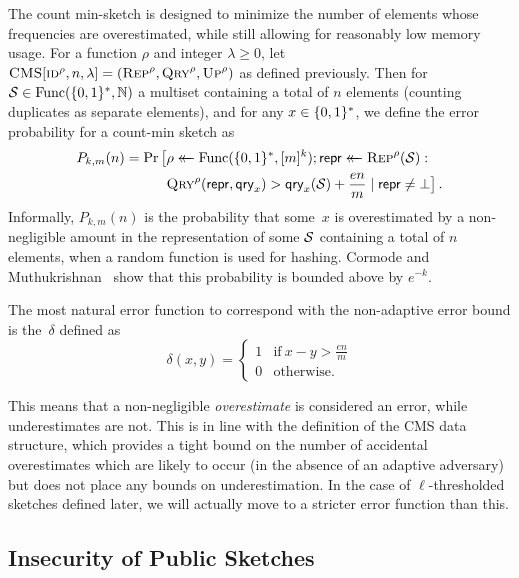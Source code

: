 %
The count min-sketch is designed to minimize the number of elements whose
frequencies are overestimated, while still allowing for reasonably low memory
usage. For a function $\rho$ and integer $\lambda\ge0$, let
$\textnormal{\textsc{CMS}}[\textnormal{\textsc{id}}^\rho,n,\lambda] = (\textnormal{\textsc{Rep}}^\rho,\textnormal{\textsc{Qry}}^\rho,\textnormal{\textsc{Up}}^\rho)$ as defined
previously. Then for $\mathcal{S} \in \mathrm{Func}(\{0,1\}^*,\mathbb{N})$ a multiset containing a total
of $n$ elements (counting duplicates as separate elements), and for any
$x \in \{0,1\}^*$, we define the error probability for a count-min sketch as
\begin{equation}\label{eq:bf-fp}
  \begin{aligned}
    P_{k,m}(n) =
      \Pr\big[&\rho \mathrel{\leftarrow\mkern-14mu\leftarrow} \mathrm{Func}(\{0,1\}^*,[m]^k);
              \mathsf{repr} \mathrel{\leftarrow\mkern-14mu\leftarrow} \textnormal{\textsc{Rep}}^\rho(\mathcal{S}): \\
              &\textnormal{\textsc{Qry}}^\rho(\mathsf{repr}, \mathsf{qry}_x) > \mathsf{qry}_x(\mathcal{S})+\frac{en}{m} \mid \mathsf{repr} \ne \bot
      \big] \,.
  \end{aligned}
\end{equation}
Informally, $P_{k,m}(n)$ is the probability that some~$x$ is overestimated by a
non-negligible amount in the representation of some $\mathcal{S}$ containing a total
of $n$ elements, when a random function is used for hashing. Cormode and
Muthukrishnan~\cite{cormode2005improved} show that this probability is bounded
above by $e^{-k}$.

%
The most natural error function to correspond with the non-adaptive error bound
is the~$\delta$ defined as
\begin{equation}
  \delta(x, y) =
  \begin{cases}
    1 & \text{if}\ x - y > \frac{en}{m} \\
    0 & \text{otherwise.}
  \end{cases}
\end{equation}

This means that a non-negligible \emph{overestimate} is considered an error,
while underestimates are not. This is in line with the definition of the CMS
data structure, which provides a tight bound on the number of accidental
overestimates which are likely to occur (in the absence of an adaptive
adversary) but does not place any bounds on underestimation. In the case of
$\ell$-thresholded sketches defined later, we will actually move to a stricter
error function than this.

\subsection{Insecurity of Public Sketches}

